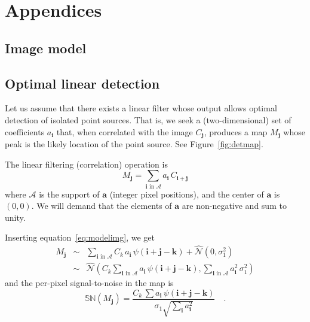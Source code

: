 \documentclass[letterpaper,preprint]{aastex}
\newcommand{\equationname}{equation}
\newcommand{\eqnref}[1]{\mbox{\equationname~\ref{#1}}}
\newcommand{\fig}{Figure}
\newcommand{\figref}[1]{\mbox{\fig~\ref{#1}}}
\newcommand{\drawnfrom}{\sim}
\newcommand{\gaussianN}{\mathcal{N}}
\newcommand{\gaussx}[1]{\hat{\gaussianN}\!\left(#1\right)}
\newcommand{\signoise}{[S/N]}
\newcommand{\snr}[1]{\mathbb{SN}(#1)}
\renewcommand{\vec}[1]{\boldsymbol{#1}}
\newcommand{\avec}{\vec{a}}
\newcommand{\ivec}{\vec{i}}
\newcommand{\jvec}{\vec{j}}
\newcommand{\kvec}{\vec{k}}
\newcommand{\coord}[2]{(#1, #2)}
\newcommand{\iina}{\ivec \,\, \mathrm{in} \,\, \mathcal{A}}
\begin{document}
\appendix

\section{Appendices}

\subsection{Image model}
\label{app:model}



\subsection{Optimal linear detection}
\label{app:lindet}

Let us assume that there exists a linear filter whose output allows
optimal detection of isolated point sources.  That is, we seek a
(two-dimensional) set of coefficients $a_{\ivec}$ that, when
correlated with the image $C_{\jvec}$, produces a map $M_{\jvec}$
whose peak is the likely location of the point source.  See
\figref{fig:detmap}.


The linear filtering (correlation) operation is
\begin{equation}
M_{\jvec} = \sum_{\iina} a_{\ivec} \, C_{\ivec + \jvec}
\label{eq:detmap1}
\end{equation}
where $\mathcal{A}$ is the support of $\avec$ (integer pixel
positions), and the center of $\avec$ is $\coord{0}{0}$.  We will
demand that the elements of $\avec$ are non-negative and sum to unity.

Inserting \eqnref{eq:modelimg}, we get
\begin{eqnarray}
M_{\jvec} &\drawnfrom& \sum_{\iina}
  C_k \, a_{\ivec} \, \psi(\ivec + \jvec - \kvec) + \gaussx{0, \sigma_1^2}
  \\
&\drawnfrom& \gaussx{ C_k \sum_{\iina} a_{\ivec} \, \psi(\ivec + \jvec - \kvec),
    \sum_{\iina} a_{\ivec}^2 \, \sigma_1^2}
\end{eqnarray}
and the per-pixel signal-to-noise in the map is
\begin{equation}
  \snr{M_{\jvec}} = \frac{C_k \, \sum a_{\ivec} \, \psi(\ivec + \jvec - \kvec)}{\sigma_1 \sqrt{\sum_{\ivec} a_{\ivec}^2}} \quad .
  \label{eq:detmapsn1}
\end{equation}
\end{document}
